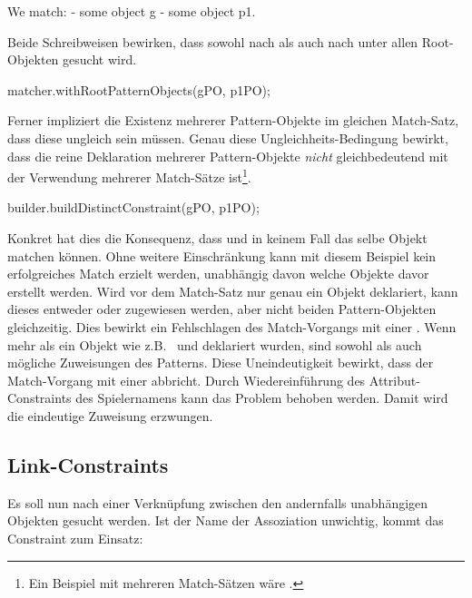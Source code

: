 \begin{mdcodeblock}
    We match:
    - some object g
    - some object p1.
\end{mdcodeblock}

Beide Schreibweisen bewirken, dass sowohl nach  als auch nach  unter allen Root-Objekten gesucht wird.

\begin{jcodeblock}
    matcher.withRootPatternObjects(gPO, p1PO);
\end{jcodeblock}

Ferner impliziert die Existenz mehrerer Pattern-Objekte im gleichen Match-Satz, dass diese ungleich sein müssen.
Genau diese Ungleichheits-Bedingung bewirkt, dass die reine Deklaration mehrerer Pattern-Objekte \emph{nicht} gleichbedeutend mit der Verwendung mehrerer Match-Sätze ist\footnote{Ein Beispiel mit mehreren Match-Sätzen wäre .}.

\begin{jcodeblock}
    builder.buildDistinctConstraint(gPO, p1PO);
\end{jcodeblock}

Konkret hat dies die Konsequenz, dass  und  in keinem Fall das selbe Objekt matchen können.
Ohne weitere Einschränkung kann mit diesem Beispiel kein erfolgreiches Match erzielt werden,
unabhängig davon welche Objekte davor erstellt werden.
Wird vor dem Match-Satz nur genau ein Objekt deklariert, kann dieses entweder  oder  zugewiesen werden, aber nicht beiden Pattern-Objekten gleichzeitig.
Dies bewirkt ein Fehlschlagen des Match-Vorgangs mit einer .
Wenn mehr als ein Objekt wie z.B.\  und  deklariert wurden, sind sowohl  als auch  mögliche Zuweisungen des Patterns.
Diese Uneindeutigkeit bewirkt, dass der Match-Vorgang mit einer  abbricht.
Durch Wiedereinführung des Attribut-Constraints des Spielernamens kann das Problem behoben werden.
Damit wird die eindeutige Zuweisung  erzwungen.

\subsection{Link-Constraints}

Es soll nun nach einer Verknüpfung zwischen den andernfalls unabhängigen Objekten gesucht werden.
Ist der Name der Assoziation unwichtig, kommt das Constraint  zum Einsatz:

